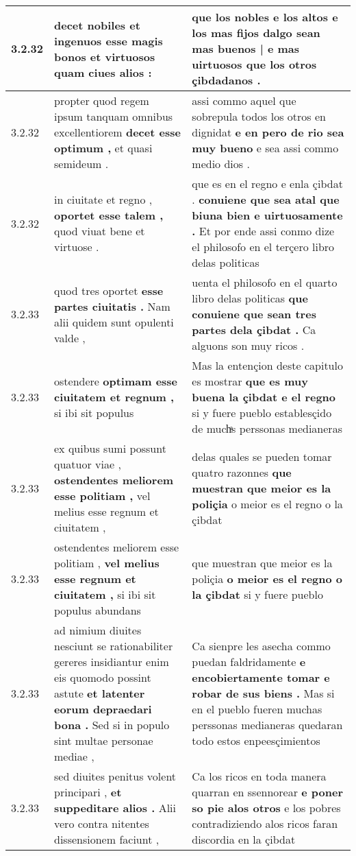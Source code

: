 \begin{tabular}{|p{1cm}|p{6.5cm}|p{6.5cm}|}
3.2.32 & decet nobiles et ingenuos \textbf{ esse magis bonos et virtuosos } quam ciues alios : & que los nobles e los altos \textbf{ e los mas fijos dalgo sean mas buenos | e mas uirtuosos } que los otros çibdadanos . \\\hline
3.2.32 & propter quod regem ipsum tanquam omnibus excellentiorem \textbf{ decet esse optimum , } et quasi semideum . & assi commo aquel que sobrepula todos los otros en dignidat \textbf{ e en pero de rio sea muy bueno } e sea assi commo medio dios . \\\hline
3.2.32 & in ciuitate et regno , \textbf{ oportet esse talem , } quod viuat bene et virtuose . & que es en el regno e enla çibdat . \textbf{ conuiene que sea atal que biuna bien e uirtuosamente . } Et por ende assi conmo dize el philosofo en el terçero libro delas politicas \\\hline
3.2.33 & quod tres oportet \textbf{ esse partes ciuitatis . } Nam alii quidem sunt opulenti valde , & uenta el philosofo en el quarto libro delas politicas \textbf{ que conuiene que sean tres partes dela çibdat . } Ca alguons son muy ricos . \\\hline
3.2.33 & ostendere \textbf{ optimam esse ciuitatem et regnum , } si ibi sit populus & Mas la entençion deste capitulo es mostrar \textbf{ que es muy buena la çibdat e el regno } si y fuere pueblo establesçido de muchͣs perssonas medianeras \\\hline
3.2.33 & ex quibus sumi possunt quatuor viae , \textbf{ ostendentes meliorem esse politiam , } vel melius esse regnum et ciuitatem , & delas quales se pueden tomar quatro razonnes \textbf{ que muestran que meior es la poliçia } o meior es el regno o la çibdat \\\hline
3.2.33 & ostendentes meliorem esse politiam , \textbf{ vel melius esse regnum et ciuitatem , } si ibi sit populus abundans & que muestran que meior es la poliçia \textbf{ o meior es el regno o la çibdat } si y fuere pueblo \\\hline
3.2.33 & ad nimium diuites nesciunt se rationabiliter gereres insidiantur enim eis quomodo possint astute \textbf{ et latenter eorum depraedari bona . } Sed si in populo sint multae personae mediae , & Ca sienpre les asecha commo puedan faldridamente \textbf{ e encobiertamente tomar e robar de sus biens . } Mas si en el pueblo fueren muchas perssonas medianeras quedaran todo estos enpeesçimientos \\\hline
3.2.33 & sed diuites penitus volent principari , \textbf{ et suppeditare alios . } Alii vero contra nitentes dissensionem faciunt , & Ca los ricos en toda manera quarran en ssennorear \textbf{ e poner so pie alos otros } e los pobres contradiziendo alos ricos faran discordia en la çibdat \\\hline

\end{tabular}
